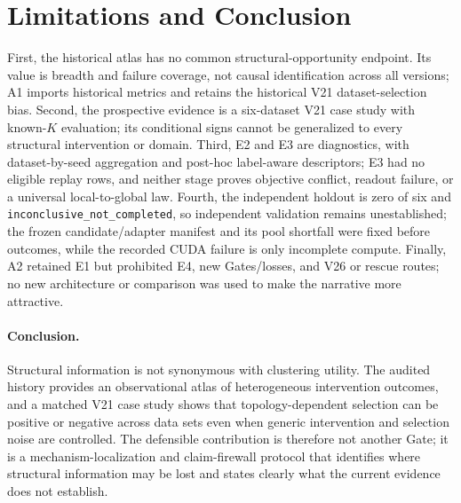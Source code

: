 \section{Limitations and Conclusion}

First, the historical atlas has no common structural-opportunity endpoint. Its
value is breadth and failure coverage, not causal identification across all
versions; A1 imports historical metrics and retains the historical V21
dataset-selection bias. Second, the prospective evidence is a six-dataset V21
case study with known-$K$ evaluation; its conditional signs cannot be generalized
to every structural intervention or domain. Third, E2 and E3 are diagnostics,
with dataset-by-seed aggregation and post-hoc label-aware descriptors; E3 had no
eligible replay rows, and neither stage proves objective conflict, readout
failure, or a universal local-to-global law. Fourth, the independent holdout is
zero of six and \texttt{inconclusive\_not\_completed}, so independent validation
remains unestablished; the frozen candidate/adapter manifest and its pool
shortfall were fixed before outcomes, while the recorded CUDA failure is only
incomplete compute. Finally, A2 retained E1 but prohibited E4, new Gates/losses,
and V26 or rescue routes; no new architecture or comparison was used to make the
narrative more attractive.

\paragraph{Conclusion.}
Structural information is not synonymous with clustering utility. The audited
history provides an observational atlas of heterogeneous intervention outcomes,
and a matched V21 case study shows that topology-dependent selection can be
positive or negative across data sets even when generic intervention and
selection noise are controlled. The defensible contribution is therefore not
another Gate; it is a mechanism-localization and claim-firewall protocol that
identifies where structural information may be lost and states clearly what the
current evidence does not establish.
